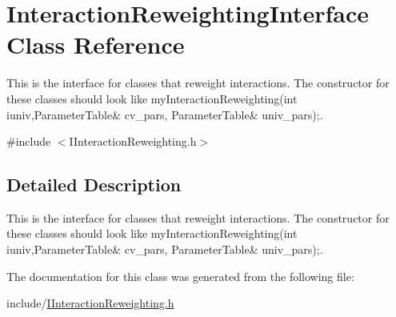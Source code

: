 \hypertarget{class_interaction_reweighting_interface}{\section{Interaction\-Reweighting\-Interface Class Reference}
\label{class_interaction_reweighting_interface}
}


This is the interface for classes that reweight interactions. The constructor for these classes should look like my\-Interaction\-Reweighting(int iuniv,\-Parameter\-Table\& cv\-\_\-pars, Parameter\-Table\& univ\-\_\-pars);.  




{\ttfamily \#include $<$I\-Interaction\-Reweighting.\-h$>$}



\subsection{Detailed Description}
This is the interface for classes that reweight interactions. The constructor for these classes should look like my\-Interaction\-Reweighting(int iuniv,\-Parameter\-Table\& cv\-\_\-pars, Parameter\-Table\& univ\-\_\-pars);. 

The documentation for this class was generated from the following file\-:\begin{DoxyCompactItemize}
\item 
include/\hyperlink{_i_interaction_reweighting_8h}{I\-Interaction\-Reweighting.\-h}\end{DoxyCompactItemize}
